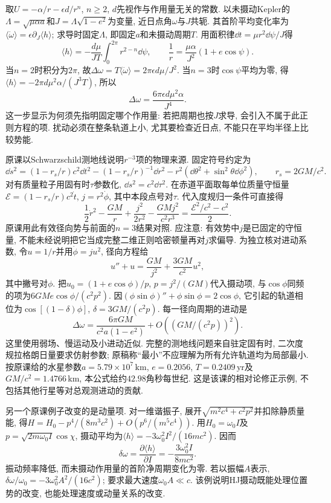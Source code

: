 取$U=-\alpha/r-\epsilon d/r^n$, $n\ge2$, $d$先视作与作用量无关的常数. 以未摄动Kepler的$\Lambda=\sqrt{\mu\alpha a}$和$J=\Lambda\sqrt{1-e^2}$为变量, 近日点角$\omega$与$J$共轭. 其首阶平均变化率为$\langle\dot\omega\rangle=\epsilon\partial_J\langle h\rangle$; 求导时固定$\Lambda$, 即固定$a$和未摄动周期$T$. 用面积律$\dd t=\mu r^2\dd\psi/J$得
\[
\langle h\rangle=-\frac{d\mu}{JT}\int_0^{2\pi}r^{2-n}\dd\psi,
\qquad \frac1r=\frac{\mu\alpha}{J^2}(1+e\cos\psi).
\]
当$n=2$时积分为$2\pi$, 故$\Delta\omega=T\langle\dot\omega\rangle=2\pi\epsilon d\mu/J^2$. 当$n=3$时$\cos\psi$平均为零, 得$\langle h\rangle=-2\pi d\mu^2\alpha/(J^3T)$, 所以
\[
\Delta\omega=\frac{6\pi\epsilon d\mu^2\alpha}{J^4}.
\]
这一步显示为何须先指明固定哪个作用量: 若把周期也按$J$求导, 会引入不属于此正则方程的项. 扰动必须在整条轨道上小, 尤其要检查近日点, 不能只在平均半径上比较势能.

原课以Schwarzschild测地线说明$r^{-3}$项的物理来源. 固定符号约定为
\[
\dd s^2=(1-r_s/r)c^2\dd t^2-(1-r_s/r)^{-1}\dd r^2
-r^2(\dd\theta^2+\sin^2\theta\dd\phi^2),\qquad r_s=2GM/c^2.
\]
对有质量粒子用固有时$\tau$参数化, $\dd s^2=c^2\dd\tau^2$. 在赤道平面取每单位质量守恒量$\mathcal E=(1-r_s/r)c^2\dot t$, $j=r^2\dot\phi$, 其中本段点号对$\tau$. 代入度规归一条件可直接得
\[
\frac12\dot r^2-\frac{GM}{r}+\frac{j^2}{2r^2}
-\frac{GMj^2}{c^2r^3}
=\frac{\mathcal E^2/c^2-c^2}{2}.
\]
原课用此有效径向势与前面的$n=3$结果对照. 应注意: 有效势中$j$是已固定的守恒量, 不能未经说明把它当成完整二维正则哈密顿量再对$j$求偏导. 为独立核对进动系数, 令$u=1/r$并用$\dot\phi=ju^2$, 径向方程给
\[
u''+u=\frac{GM}{j^2}+\frac{3GM}{c^2}u^2,
\]
其中撇号对$\phi$. 把$u_0=(1+e\cos\phi)/p$, $p=j^2/(GM)$代入摄动项, 与$\cos\phi$同频的项为$6GMe\cos\phi/(c^2p^2)$. 因$(\phi\sin\phi)''+\phi\sin\phi=2\cos\phi$, 它引起的轨道相位为$\cos[(1-\delta)\phi]$, $\delta=3GM/(c^2p)$. 每一径向周期的进动是
\[
\Delta\omega=\frac{6\pi GM}{c^2a(1-e^2)}
+O\!\left((GM/(c^2p))^2\right).
\]
这里使用弱场、慢运动及小进动近似. 完整的测地线问题来自驻定固有时, 二次度规拉格朗日量要求仿射参数; 原稿称“最小”不应理解为所有允许轨道均为局部最小. 按原课给的水星参数$a=5.79\times10^7\,\mathrm{km}$, $e=0.2056$, $T=0.2409\,\mathrm{yr}$及$GM/c^2=1.4766\,\mathrm{km}$, 本公式给约$42.98$角秒每世纪. 这是该课的相对论修正示例, 不包括其他行星等对总观测进动的贡献.

另一个原课例子改变的是动量项. 对一维谐振子, 展开$\sqrt{m^2c^4+c^2p^2}$并扣除静质量能, 得$H=H_0-p^4/(8m^3c^2)+O(p^6/(m^5c^4))$. 用$H_0=\omega_0I$及$p=\sqrt{2m\omega_0I}\cos\chi$, 摄动平均为$\langle h\rangle=-3\omega_0^2I^2/(16mc^2)$. 因而
\[
\delta\omega=\frac{\partial\langle h\rangle}{\partial I}
=-\frac{3\omega_0^2I}{8mc^2}.
\]
振动频率降低, 而未摄动作用量的首阶净周期变化为零. 若以振幅$A$表示, $\delta\omega/\omega_0=-3\omega_0^2A^2/(16c^2)$; 要求最大速度$\omega_0A\ll c$. 该例说明HJ摄动既能处理位置势的改变, 也能处理速度或动量关系的改变.
